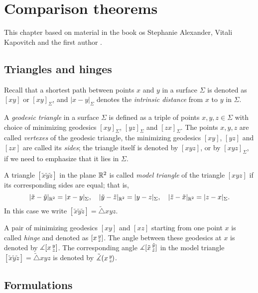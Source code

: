 \chapter{Comparison theorems}

This chapter based on material in the book os Stephanie Alexander, Vitali Kapovitch and the first author \cite{alexander-kapovitch-petrunin2027}.

\section{Triangles and hinges}

Recall that a shortest path between points $x$ and $y$ in a surface $\Sigma$ is denoted as $[xy]$ or $[xy]_\Sigma$, and
$|x-y|_\Sigma$ denotes the \emph{intrinsic distance} from $x$ to $y$ in $\Sigma$.

A \emph{geodesic triangle} in a surface $\Sigma$ is defined as a triple of points $x,y,z\in \Sigma$ with choice of minimizing geodesics $[xy]_\Sigma$, $[yz]_\Sigma$ and $[zx]_\Sigma$.
The points $x,y,z$ are called {}\emph{vertexes} of the geodesic triangle,
the minimizing geodesics $[xy]$, $[yz]$ and $[zx]$ are called its {}\emph{sides};
the triangle itself is denoted by $[xyz]$, or by $[xyz]_\Sigma$, if we need to emphasize that it lies in $\Sigma$.

A triangle $[\tilde x\tilde y\tilde z]$ in the plane $\mathbb{R}^2$ is called \emph{model triangle} of the triangle $[xyz]$
if its corresponding sides are equal;
that is,
\[|\tilde x-\tilde y|_{\mathbb{R}^2}=|x-y|_\Sigma,
\quad
|\tilde y-\tilde z|_{\mathbb{R}^2}=|y-z|_\Sigma,
\quad
|\tilde z-\tilde x|_{\mathbb{R}^2}=|z-x|_\Sigma.
\]
In this case we write $[\tilde x\tilde y\tilde z]=\tilde\triangle xyz$.

A pair of minimizing geodesics $[xy]$ and $[xz]$ starting from one point $x$ is called \emph{hinge} and denoted as $[x\,{}^{y}_{z}]$.
The angle between these geodesics at $x$ is denoted by $\measuredangle[x\,{}^{y}_{z}]$.
The corresponding angle $\measuredangle[\tilde x\,{}^{\tilde y}_{\tilde z}]$ in the model triangle $[\tilde x\tilde y\tilde z]=\tilde\triangle xyz$ is denoted by $\tilde\measuredangle(x\,{}^{y}_{z}\hspace{-0.2ex})$.

\section{Formulations}

